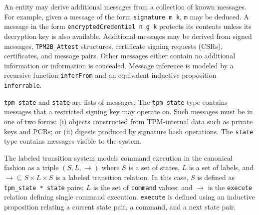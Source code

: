 \documentclass[runningheads]{llncs}
\begin{document}
An entity may derive additional messages from a collection of known
messages.  For example, given a message of the form
\verb|signature m k|, \verb|m| may be deduced.  A message in the form
\verb|encryptedCredential n g k| protects its contents unless its
decryption key is also available.  Additional messages may be derived
from signed messages, \verb|TPM2B_Attest| structures, certificate
signing requests (CSRs), certificates, and message pairs. Other
messages either contain no additional information or information is
concealed.  Message inference is modeled by a
recursive function \verb|inferFrom| and an equivalent inductive
proposition \verb|inferrable|.

\verb|tpm_state| and \verb|state| are lists of messages. The
\verb|tpm_state| type contains messages that a restricted signing key
may operate on. Such messages must be in one of two forms: (i) objects
constructed from TPM-internal data such as private keys and PCRs; or
(ii) digests produced by signature hash operations.  The \verb|state|
type contains messages visible to the system.

The labeled transition system models command execution in the
canonical fashion as a triple $(S,L,\rightarrow)$ where $S$ is a set
of states, $L$ is a set of labels, and
$\rightarrow \subseteq S \times L \times S$ is a labeled transition
relation.  In this case, $S$ is defined as \verb|tpm_state * state|
pairs; $L$ is the set of \verb|command| values; and $\rightarrow$ is
the \verb|execute| relation defining single command execution.
\verb|execute| is defined using an inductive proposition relating a
current state pair, a command, and a next state pair.


\end{document}
